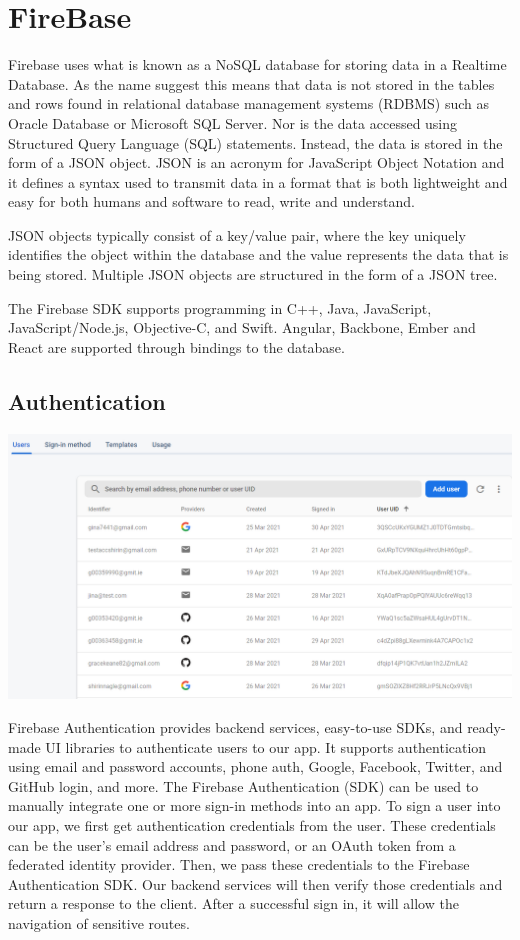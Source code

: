 \section{FireBase}
Firebase uses what is known as a NoSQL database for storing data in a Realtime Database. As the name suggest this means that data is not stored in the tables and rows found in relational database management systems (RDBMS) such as Oracle Database or Microsoft SQL Server. Nor is the data accessed using Structured Query Language (SQL) statements. Instead, the data is stored in the form of a JSON object. JSON is an acronym for JavaScript Object Notation and it defines a syntax used to transmit data in a format that is both lightweight and easy for both humans and software to read, write and understand.

JSON objects typically consist of a key/value pair, where the key uniquely identifies the object within the database and the value represents the data that is being stored. Multiple JSON objects are structured in the form of a JSON tree.

The Firebase SDK supports programming in C++, Java, JavaScript, JavaScript/Node.js, Objective-C, and Swift. Angular, Backbone, Ember and React are supported through bindings to the database.
\subsection{Authentication}

\begin{center}    
      \includegraphics[scale=0.4]{img/auth.PNG}
\end{center}

Firebase Authentication provides backend services, easy-to-use SDKs, and ready-made UI libraries to authenticate users to our app. 
It supports authentication using email and password accounts, phone auth, Google, Facebook, Twitter, and GitHub login, and more. The Firebase Authentication (SDK) can be used to manually integrate one or more sign-in methods into an app.
To sign a user into our app, we first get authentication credentials from the user. These credentials can be the user's email address and password, or an OAuth token from a federated identity provider. Then, we pass these credentials to the Firebase Authentication SDK. Our backend services will then verify those credentials and return a response to the client.
After a successful sign in, it will allow the navigation of sensitive routes.

